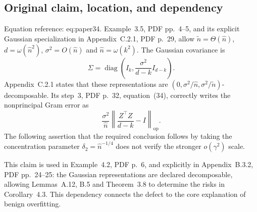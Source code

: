 \documentclass[10pt]{article}
\begin{document}
\subsection*{Original claim, location, and dependency}
Equation reference: eq:paper34. Example 3.5, PDF pp. 4–5, and its explicit Gaussian specialization in Appendix C.2.1, PDF p. 29, allow \(\widetilde n=\Theta(\widehat n)\), \(d=\omega(\widehat n^2)\), \(\sigma^2=O(\widehat n)\) and \(\widehat n=\omega(k^2)\). The Gaussian covariance is \[\Sigma=\operatorname{diag}\left(I_k,\frac{\sigma^2}{d-k}I_{d-k}\right).\] Appendix C.2.1 states that these representations are \((0,\sigma^2/\widehat n,\sigma^2/\widetilde n)\)-decomposable. Its step 3, PDF p. 32, equation (34), correctly writes the nonprincipal Gram error as \[
 \frac{\sigma^2}{\widehat n}
 \left\|\frac{Z^\top Z}{d-k}-I\right\|_{\mathrm{op}}.\] The following assertion that the required conclusion follows by taking the concentration parameter \(\delta_2=\widehat n^{-1/4}\) does not verify the stronger \(o(\gamma^2)\) scale.\par
This claim is used in Example 4.2, PDF p. 6, and explicitly in Appendix B.3.2, PDF pp. 24–25: the Gaussian representations are declared decomposable, allowing Lemmas A.12, B.5 and Theorem 3.8 to determine the risks in Corollary 4.3. This dependency connects the defect to the core explanation of benign overfitting.\par
\end{document}
